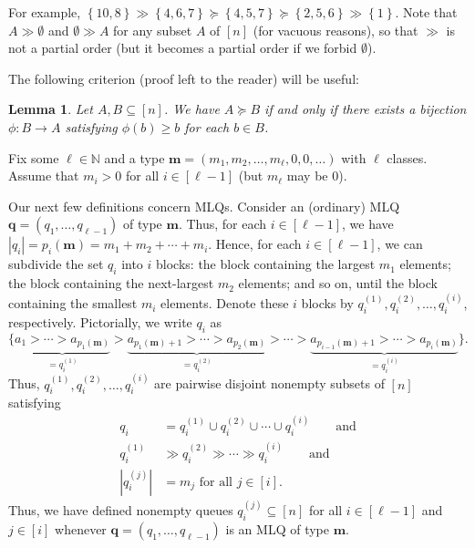 \documentclass[reqno]{amsart}
\newcommand{\0}{\phantom{c}}
\newcommand{\mm}{\mathbf{m}}
\newcommand{\qq}{\mathbf{q}}
\newcommand{\NN}{\mathbb{N}}
\newcommand{\set}[1]{\left\{ #1 \right\}}
\newcommand{\abs}[1]{\left| #1 \right|}
\newcommand{\tup}[1]{\left( #1 \right)}
\newcommand{\ive}[1]{\left[ #1 \right]}
\theoremstyle{plain}
\newtheorem{lemma}[thm]{Lemma}
\theoremstyle{definition}
\numberwithin{equation}{section}
\newcommand{\darij}[1]{\todo[size=\tiny,color=red!30]{#1 \\ \hfill --- Darij}}
\newcommand{\travis}[1]{\todo[size=\tiny,color=blue!30]{#1 \\ \hfill --- Travis}}
\begin{document}
For example, $\set{10,8} \gg \set{4,6,7} \succeq \set{4,5,7} \succeq \set{2,5,6}  \gg \set{1}$.
Note that $A \gg \emptyset$ and $\emptyset \gg A$ for any subset $A$ of $\ive{n}$ (for vacuous reasons), so that $\gg$ is not a partial order (but it becomes a partial order if we forbid $\emptyset$).

The following criterion (proof left to the reader) will be useful:

\begin{lemma}
\label{lem:determinant_form.gale1}
Let $A, B \subseteq \ive{n}$.
We have $A \succeq B$ if and only if there exists a bijection $\phi \colon B \to A$ satisfying $\phi(b) \geq b$ for each $b \in B$.
\end{lemma}

Fix some $\ell \in \NN$ and a type $\mm = \tup{m_1,m_2, \dotsc, m_{\ell}, 0, 0, \ldots}$ with $\ell$ classes.
Assume that $m_i > 0$ for all $i \in \ive{\ell-1}$ (but $m_{\ell}$ may be $0$).

Our next few definitions concern MLQs.
Consider an (ordinary) MLQ $\qq = \tup{q_1,\ldots,q_{\ell-1}}$ of type $\mm$.
Thus, for each $i \in \ive{\ell-1}$, we have $\abs{q_i} = p_i(\mm) = m_1 + m_2 + \cdots + m_i$.
Hence, for each $i \in \ive{\ell-1}$, we can subdivide the set $q_i$ into $i$ blocks: the block containing the largest $m_1$ elements; the block containing the next-largest $m_2$ elements; and so on, until the block containing the smallest $m_i$ elements.
Denote these $i$ blocks by $q_i^{(1)}, q_i^{(2)}, \dotsc, q_i^{(i)}$, respectively.
Pictorially, we write $q_i$ as
\[
\bigl\{ \underbrace{a_1 > \cdots > a_{p_1(\mm)}}_{=q_i^{(1)}} > \underbrace{a_{p_1(\mm)+1} > \cdots > a_{p_2(\mm)}}_{=q_i^{(2)}} > \cdots > \underbrace{a_{p_{i-1}(\mm)+1} > \cdots > a_{p_i(\mm)}}_{=q_i^{(i)}} \bigr\}.
\]
Thus, $q_i^{(1)}, q_i^{(2)}, \dotsc, q_i^{(i)}$ are pairwise disjoint nonempty subsets of $\ive{n}$ satisfying
\begin{subequations}
\label{eq.determinant_form.qij}
\begin{align}
\label{eq.determinant_form.qij.1}
  q_i  & = q_i^{(1)} \cup q_i^{(2)} \cup \cdots \cup q_i^{(i)}
\qquad \text{and}
\\ \label{eq.determinant_form.qij.2}
  q_i^{(1)} & \gg q_i^{(2)} \gg \cdots \gg q_i^{(i)}
\qquad \text{and}
\\ \label{eq.determinant_form.qij.3}
  \abs{q_i^{(j)}} & = m_j \text{ for all } j \in \ive{i}.
\end{align}
\end{subequations}
Thus, we have defined nonempty queues $q_i^{(j)} \subseteq \ive{n}$ for all $i \in \ive{\ell-1}$ and $j \in \ive{i}$ whenever $\qq = \tup{q_1, \dotsc, q_{\ell-1}}$ is an MLQ of type $\mm$.
\end{document}

